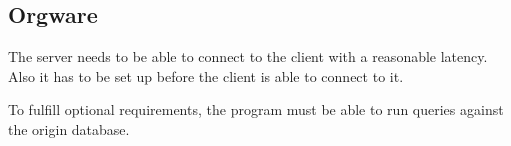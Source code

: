 \subsection{Orgware}

The server needs to be able to connect to the client with a reasonable latency.
Also it has to be set up before the client is able to connect to it.


To fulfill optional requirements, the program must be able to run queries against
the origin \gls{database}. 

% 
